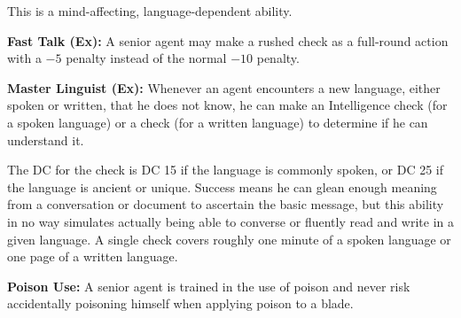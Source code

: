 This is a mind-affecting, language-dependent ability.

\textbf{Fast Talk (Ex):} A senior agent may make a rushed  check as a full-round action with a $-5$ penalty instead of the normal $-10$ penalty.

\textbf{Master Linguist (Ex):} Whenever an agent encounters a new language, either spoken or written, that he does not know, he can make an Intelligence check (for a spoken language) or a  check (for a written language) to determine if he can understand it.

The DC for the check is DC 15 if the language is commonly spoken, or DC 25 if the language is ancient or unique. Success means he can glean enough meaning from a conversation or document to ascertain the basic message, but this ability in no way simulates actually being able to converse or fluently read and write in a given language. A single check covers roughly one minute of a spoken language or one page of a written language.

\textbf{Poison Use:} A senior agent is trained in the use of poison and never risk accidentally poisoning himself when applying poison to a blade.



